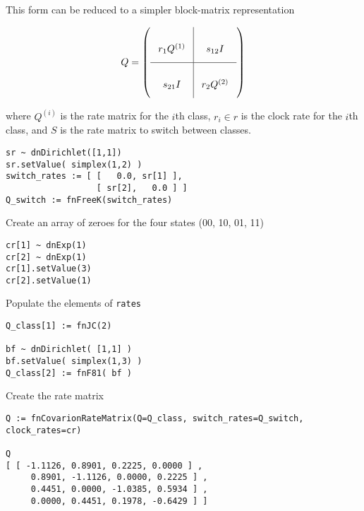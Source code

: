 This form can be reduced to a simpler block-matrix representation

\begin{equation*}
Q = \left(
\arraycolsep=8pt\def\arraystretch{3.0}
\begin{array}{c|c}
r_1 Q^{(1)} & s_{12} I  \\
\hline
s_{21} I & r_2 Q^{(2)} \\
\end{array}
\right)
\end{equation*}


where $Q^{(i)}$ is the rate matrix for the $i$th class, $r_i \in r$ is the clock rate for the $i$th class, and $S$ is the rate matrix to switch between classes.


{\tt \begin{snugshade*}
\begin{lstlisting}
sr ~ dnDirichlet([1,1])
sr.setValue( simplex(1,2) )
switch_rates := [ [   0.0, sr[1] ],
                  [ sr[2],   0.0 ] ]
Q_switch := fnFreeK(switch_rates)
\end{lstlisting}
\end{snugshade*}}

Create an array of zeroes for the four states (00, 10, 01, 11)

{\tt \begin{snugshade*}
\begin{lstlisting}
cr[1] ~ dnExp(1)
cr[2] ~ dnExp(1)
cr[1].setValue(3)
cr[2].setValue(1)
\end{lstlisting}
\end{snugshade*}}

Populate the elements of {\tt rates}

{\tt \begin{snugshade*}
\begin{lstlisting}
Q_class[1] := fnJC(2)

bf ~ dnDirichlet( [1,1] )
bf.setValue( simplex(1,3) )
Q_class[2] := fnF81( bf )

\end{lstlisting}
\end{snugshade*}}

Create the rate matrix

{\tt \begin{snugshade*}
\begin{lstlisting}
Q := fnCovarionRateMatrix(Q=Q_class, switch_rates=Q_switch, clock_rates=cr)

Q
[ [ -1.1126, 0.8901, 0.2225, 0.0000 ] ,
     0.8901, -1.1126, 0.0000, 0.2225 ] ,
     0.4451, 0.0000, -1.0385, 0.5934 ] ,
     0.0000, 0.4451, 0.1978, -0.6429 ] ]
\end{lstlisting}
\end{snugshade*}}

